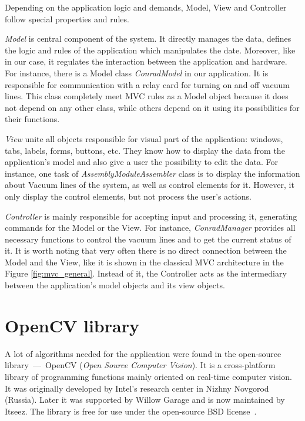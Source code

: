 Depending on the application logic and demands, Model, View and Controller follow special properties and rules.

\emph{Model} is central component of the system. It directly manages the data, defines the logic and rules of the application which manipulates the date. Moreover, like in our case, it regulates the interaction between the application and hardware. For instance, there is a Model class \emph{ConradModel} in our application. It is responsible for communication with a relay card for turning on and off vacuum lines. This class completely meet MVC rules as a Model object because it does not depend on any other class, while others depend on it using its possibilities for their functions.

\emph{View} unite all objects responsible for visual part of the application: windows, tabs, labels, forms, buttons, etc. They know how to display the data from the application's model and also give a user the possibility to edit the data. For instance, one task of \emph{AssemblyModuleAssembler} class is to display the information about Vacuum lines of the system, as well as control elements for it. However, it only display the control elements, but not process the user's actions.

\emph{Controller} is mainly responsible for accepting input and processing it, generating commands for the Model or the View. For instance, \emph{ConradManager} provides all necessary functions to control the vacuum lines and to get the current status of it. It is worth noting that very often there is no direct connection between the Model and the View, like it is shown in the classical MVC architecture in the Figure \ref{fig:mvc_general}. Instead of it, the Controller acts as the intermediary between the application's model objects and its view objects.

\section{OpenCV library}

A lot of algorithms needed for the application were found in the open-source library~---~OpenCV (\textit{Open Source Computer Vision}). It is a cross-platform library of programming functions mainly oriented on real-time computer vision. It was originally developed by Intel's research center in Nizhny Novgorod (Russia). Later it was supported by Willow Garage and is now maintained by Itseez. The library is free for use under the open-source BSD license~\cite{OpenCV_general}.

